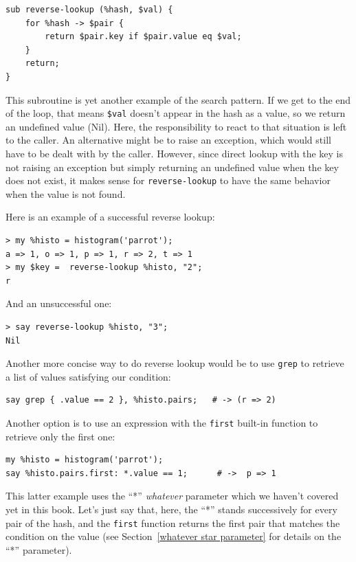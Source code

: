 \begin{verbatim}
sub reverse-lookup (%hash, $val) { 
    for %hash -> $pair { 
        return $pair.key if $pair.value eq $val;
    }
    return;
}
\end{verbatim}
%
This subroutine is yet another example of the search pattern.
If we get to the end of the loop, that means \verb'$val'
doesn't appear in the hash as a value, so we return an 
undefined value (Nil). Here, the responsibility to react 
to that situation is left to the caller. An alternative 
might be to raise an exception, which would still have 
to be dealt with by the caller. However, since direct 
lookup with the key is not raising an exception but simply 
returning an undefined value when the key does not exist, 
it makes sense for {\tt reverse-lookup} to have the same 
behavior when the value is not found.

Here is an example of a successful reverse lookup:

\begin{verbatim}
> my %histo = histogram('parrot');
a => 1, o => 1, p => 1, r => 2, t => 1
> my $key =  reverse-lookup %histo, "2";
r
\end{verbatim}
%
And an unsuccessful one:

\begin{verbatim}
> say reverse-lookup %histo, "3";
Nil
\end{verbatim}
%

Another more concise way to do reverse lookup would be to 
use {\tt grep} to retrieve a list of values satisfying our 
condition:
\begin{verbatim}
say grep { .value == 2 }, %histo.pairs;   # -> (r => 2)
\end{verbatim}

Another option is to use an expression with the {\tt first} 
built-in function to retrieve only the first one:
\begin{verbatim}
my %histo = histogram('parrot');
say %histo.pairs.first: *.value == 1;      # ->  p => 1
\end{verbatim}

This latter example uses the ``*'' \emph{whatever} parameter 
which we haven't covered yet in this book. Let's just say that, 
here, the ``*'' stands successively for every pair of the hash, 
and the {\tt first} function returns the first pair that matches 
the condition on the value (see 
Section~\ref{whatever star parameter} for details on the 
``*'' parameter).

